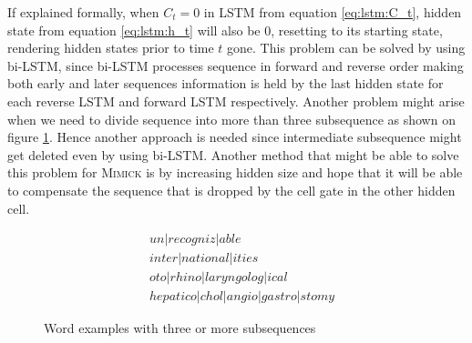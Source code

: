         If explained formally, when $C_t = 0$ in LSTM from equation
        \ref{eq:lstm:C_t}, hidden state from equation
        \ref{eq:lstm:h_t} will also be $0$, resetting to its starting
        state, rendering hidden states prior to time $t$ gone. This
        problem can be solved by using bi-LSTM, since bi-LSTM
        processes sequence in forward and reverse order making both
        early and later sequences information is held by the last
        hidden state for each reverse LSTM and forward LSTM
        respectively. Another problem might arise when we need to
        divide sequence into more than three subsequence as shown on
        figure \ref{fig:subsequence}. Hence another approach is needed
        since intermediate subsequence might get deleted even by using
        bi-LSTM. Another method that might be able to solve this
        problem for \textsc{Mimick} is by increasing hidden size and
        hope that it will be able to compensate the sequence that is
        dropped by the cell gate in the other hidden cell.
        \begin{figure}
            \begin{align*}
                &un \vert recogniz \vert able \\
                &inter \vert national \vert ities \\
                &oto \vert rhino \vert laryngolog \vert ical \\
                &hepatico \vert chol \vert angio \vert gastro \vert stomy
            \end{align*}
            \caption{Word examples with three or more subsequences}
            \label{fig:subsequence}
        \end{figure}

